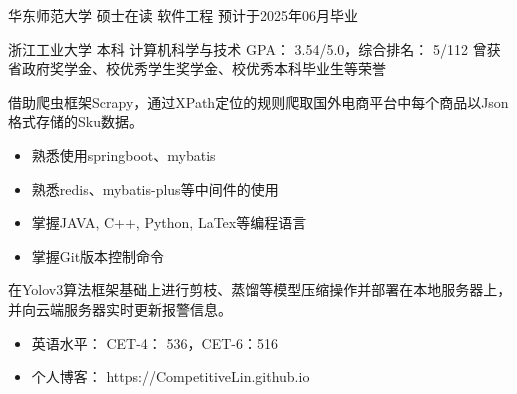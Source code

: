 


	





{华东师范大学}
{硕士在读}
{软件工程}
{预计于2025年06月毕业}

{浙江工业大学}
{本科}
{计算机科学与技术}
{GPA： 3.54/5.0，综合排名： 5/112}
{曾获省政府奖学金、校优秀学生奖学金、校优秀本科毕业生等荣誉}

\vspace*{-0.2cm}

借助爬虫框架Scrapy，通过XPath定位的规则爬取国外电商平台中每个商品以Json格式存储的Sku数据。

\begin{itemize}
	\item 熟悉使用springboot、mybatis
	\item 熟悉redis、mybatis-plus等中间件的使用
	\item 掌握JAVA, C++, Python, LaTex等编程语言
	\item 掌握Git版本控制命令
\end{itemize}


在Yolov3算法框架基础上进行剪枝、蒸馏等模型压缩操作并部署在本地服务器上，并向云端服务器实时更新报警信息。


\begin{itemize}	
	\item 英语水平： CET-4： 536，CET-6：516
	\item 个人博客： https://CompetitiveLin.github.io
\end{itemize}


